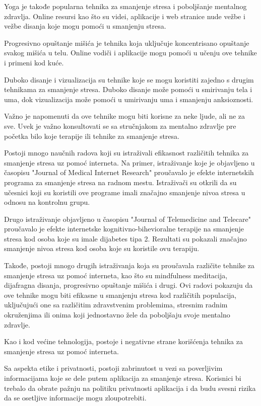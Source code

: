 \documentclass[a4paper]{article}
\begin{document}
Yoga je takođe popularna tehnika za smanjenje stresa i poboljšanje mentalnog zdravlja. Online resursi kao što su videi, aplikacije i web stranice nude vežbe i vežbe disanja koje mogu pomoći u smanjenju stresa.

Progresivno opuštanje mišića je tehnika koja uključuje koncentrisano opuštanje svakog mišića u telu. Online vodiči i aplikacije mogu pomoći u učenju ove tehnike i primeni kod kuće.

Duboko disanje i vizualizacija su tehnike koje se mogu koristiti zajedno s drugim tehnikama za smanjenje stresa. Duboko disanje može pomoći u smirivanju tela i uma, dok vizualizacija može pomoći u umirivanju uma i smanjenju anksioznosti.

Važno je napomenuti da ove tehnike mogu biti korisne za neke ljude, ali ne za sve. Uvek je važno konsultovati se sa stručnjakom za mentalno zdravlje pre početka bilo koje terapije ili tehnike za smanjenje stresa.

Postoji mnogo naučnih radova koji su istraživali efikasnost različitih tehnika za smanjenje stresa uz pomoć interneta. Na primer, istraživanje koje je objavljeno u časopisu "Journal of Medical Internet Research" proučavalo je efekte internetskih programa za smanjenje stresa na radnom mestu. Istraživači su otkrili da su učesnici koji su koristili ove programe imali značajno smanjenje nivoa stresa u odnosu na kontrolnu grupu.

Drugo istraživanje objavljeno u časopisu "Journal of Telemedicine and Telecare" proučavalo je efekte internetske kognitivno-bihevioralne terapije na smanjenje stresa kod osoba koje su imale dijabetes tipa 2. Rezultati su pokazali značajno smanjenje nivoa stresa kod osoba koje su koristile ovu terapiju.

Takođe, postoji mnogo drugih istraživanja koja su proučavala različite tehnike za smanjenje stresa uz pomoć interneta, kao što su mindfulness meditacija, dijafragna disanja, progresivno opuštanje mišića i drugi. Ovi radovi pokazuju da ove tehnike mogu biti efikasne u smanjenju stresa kod različitih populacija, uključujući one sa različitim zdravstvenim problemima, stresnim radnim okruženjima ili onima koji jednostavno žele da poboljšaju svoje mentalno zdravlje.

Kao i kod većine tehnologija, postoje i negativne strane korišćenja tehnika za smanjenje stresa uz pomoć interneta.

Sa aspekta etike i privatnosti, postoji zabrinutost u vezi sa poverljivim informacijama koje se dele putem aplikacija za smanjenje stresa. Korisnici bi trebalo da obrate pažnju na politiku privatnosti aplikacija i da budu svesni rizika da se osetljive informacije mogu zloupotrebiti.
\end{document}
